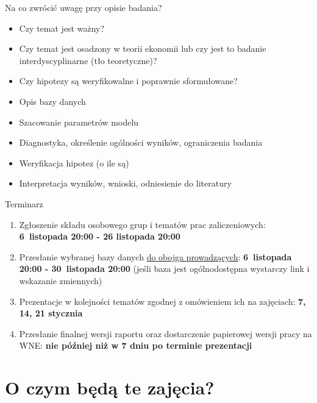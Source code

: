 \documentclass{beamer}
\begin{document}
\begin{frame}{Na co zwrócić uwagę przy opisie badania?}
  \begin{itemize}
  \item Czy temat jest ważny?
  \item Czy temat jest osadzony w teorii ekonomii lub czy jest to badanie interdyscyplinarne (tło teoretyczne)?
  \item Czy hipotezy są weryfikowalne i poprawnie sformułowane?
  \item Opis bazy danych
  \item Szacowanie parametrów modelu
  \item Diagnostyka, określenie ogólności wyników, ograniczenia badania
  \item Weryfikacja hipotez (o ile są)
  \item Interpretacja wyników, wnioski, odniesienie do literatury
  \end{itemize}
\end{frame}

\begin{frame}{Terminarz}
  \begin{enumerate}
  \item Zgłoszenie składu osobowego grup i tematów prac zaliczeniowych: \textbf{6~listopada 20:00 - 26 listopada 20:00}
  \item Przesłanie wybranej bazy danych \underline{do obojga prowadzących}: \textbf{6~listopada 20:00 -  30~listopada 20:00} (jeśli baza jest ogólnodostępna wystarczy link i wskazanie zmiennych)
  \item Prezentacje w kolejności tematów zgodnej z omówieniem ich na zajęciach: \textbf{7, 14, 21 stycznia}
  \item Przesłanie finalnej wersji raportu oraz dostarczenie papierowej wersji pracy na WNE: \textbf{nie później niż w 7 dniu po terminie prezentacji}
  \end{enumerate}
\end{frame}

\section{O czym będą te zajęcia?}
\end{document}
